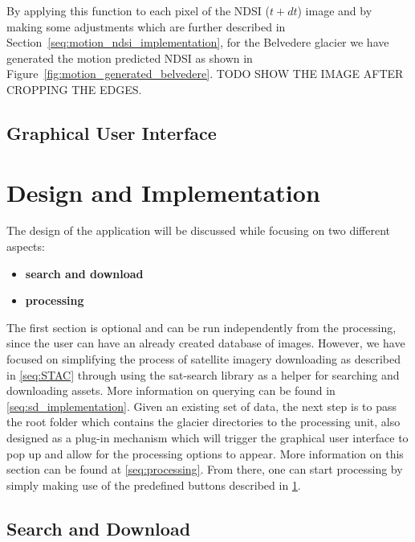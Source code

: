 \documentclass[11pt, a4paper]{report}
\begin{document}
	By applying this function to each pixel of the NDSI (\(t + dt\)) image and by making some adjustments which are further described in Section~\ref{seq:motion_ndsi_implementation}, for the Belvedere glacier we have generated the motion predicted NDSI as shown in Figure~\ref{fig:motion_generated_belvedere}.
	TODO SHOW THE IMAGE AFTER CROPPING THE EDGES.

	
	\section{Graphical User Interface}
	\label{seq:gui}

	\chapter{Design and Implementation}
	\label{cha:design_and_implementation}
	
	The design of the application will be discussed while focusing on two different aspects:
	\begin{itemize}
		\item \textbf{search and download}
		\item \textbf{processing}
	\end{itemize}
	The first section is optional and can be run independently from the processing, since the user can have an already created database of images. However, we have focused on simplifying the process of satellite imagery downloading as described in \ref{seq:STAC} through using the sat-search library as a helper for searching and downloading assets. More information on querying can be found in \ref{seq:sd_implementation}. 
	Given an existing set of data, the next step is to pass the root folder which contains the glacier directories to the processing unit, also designed as a plug-in mechanism which will trigger the graphical user interface to pop up and allow for the processing options to appear. More information on this section can be found at \ref{seq:processing}. From there, one can start processing by simply making use of the predefined buttons described in \ref{seq:gui}.
	
	\section{Search and Download}
	
\end{document}
